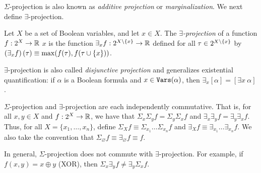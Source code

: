 $\Sigma$-projection is also known as \emph{additive projection} or 
\emph{marginalization}.
We next define $\exists$-projection.
\begin{definition}
\label{def_exist}
    Let $X$ be a set of Boolean variables, and let $x \in X$.
    The \emph{$\exists$-projection} of a function $f: 2^X \to \mathbb{R}$ \wrt{} $x$ is the function $\exists_x f: 2^{X \setminus \left\{ x \right\}} \to \mathbb{R}$ defined for all $\tau \in 2^{X \setminus \left\{ x \right\}}$ by $\left( \exists_x f \right)(\tau) \equiv \max(f(\tau), f(\tau \cup \left\{ x \right\}))$.
\end{definition}

$\exists$-projection is also called \emph{disjunctive projection} and generalizes existential quantification: if $\alpha$ is a Boolean formula and $x \in \texttt{\upshape Vars}(\alpha)$, then $\exists_x [\alpha] = [\exists x ~ \alpha]$.


$\Sigma$-projection and $\exists$-projection are each independently commutative. 
That is, for all $x, y \in X$ and $f: 2^X \to \mathbb{R}$, we have that $\Sigma_x \Sigma_y f = \Sigma_y \Sigma_x f$ and $\exists_x \exists_y f = \exists_y \exists_x f$. 
Thus, for all $X = \{x_1, \ldots, x_n\}$, define $\Sigma_X f \equiv \Sigma_{x_1} \ldots \Sigma_{x_n} f$ and $\exists_X f \equiv \exists_{x_1} \ldots \exists_{x_n} f$. 
We also take the convention that $\Sigma_\varnothing f \equiv \exists_\varnothing f \equiv f$.

In general, $\Sigma$-projection does not commute with $\exists$-projection. For example, if $f(x, y) = x \oplus y$ (XOR), then $\Sigma_x \exists_y f \neq \exists_y \Sigma_x f$.




